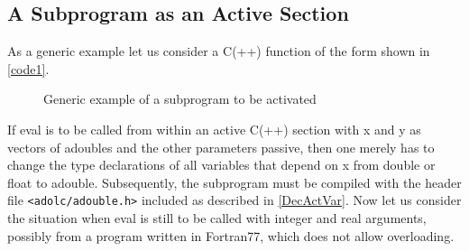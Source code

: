 \documentclass[11pt,twoside]{article}
\begin{document}
\subsection{A Subprogram as an Active Section} 
%
As a generic example let us consider a C(++) function of the form
shown in \autoref{code1}.
%
\begin{figure}[hbt]
\caption{Generic example of a subprogram to be activated}
\label{code1}
\end{figure}
%

If {\sf eval} is to be called from within an active C(++)
section with {\sf x}
and {\sf y} as vectors of {\sf adouble}s and the other parameters
passive, then one merely has to change the type declarations of all
variables that depend on {\sf x} from {\sf double} or {\sf float} to
{\sf adouble}. Subsequently, the subprogram must be compiled with the
header file \verb=<adolc/adouble.h>= included as described
in \autoref{DecActVar}. Now let us consider the situation when {\sf eval} is
still to be called with integer and real arguments, possibly from
a program written in Fortran77, which  does not allow overloading. 
\end{document}

